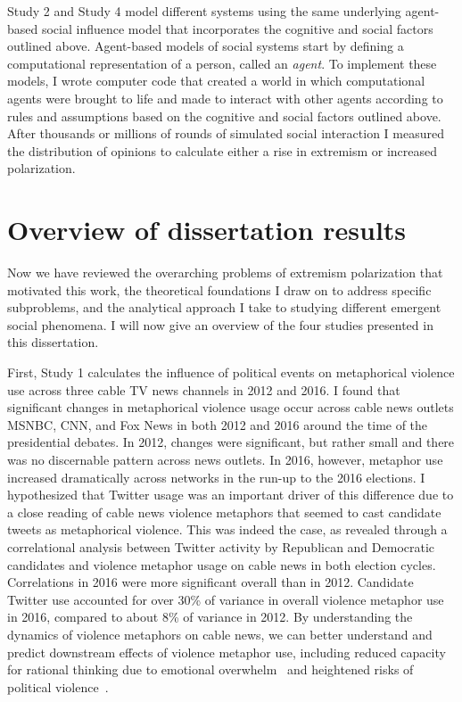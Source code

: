 \documentclass[12pt,letterpaper]{article}
\begin{document}
Study 2 and Study 4 model different systems using the same underlying
agent-based social influence model that incorporates the cognitive and social 
factors outlined above. Agent-based models of social systems start 
by defining a computational representation of a person, called
an \emph{agent}. To implement these models, 
I wrote computer code that created a world in which computational agents
were brought to life and made to interact with other agents according to rules and
assumptions based on the cognitive and social factors outlined above. 
After thousands or millions of rounds of simulated social interaction I
measured the distribution of opinions to calculate either a rise in extremism or
increased polarization.
     

\section{Overview of dissertation results}

Now we have reviewed the overarching problems of extremism polarization that
motivated this work, the
theoretical foundations I draw on to address specific subproblems, and
the analytical approach I take to studying different emergent social
phenomena. I will now give an overview of the four studies presented in this
dissertation.

First, Study 1  
calculates the influence of political events on metaphorical violence use across
three cable TV news channels in 2012 and 2016. I found that significant changes
in metaphorical violence usage occur across cable news outlets MSNBC, CNN, and
Fox News in both 2012 and 2016 around the time of the presidential debates. 
In 2012, changes were significant, but rather small and there was no discernable
pattern across news outlets. In 2016, however, metaphor use increased dramatically
across networks in the run-up to the 2016 elections.  
I hypothesized that Twitter usage was an important driver of this difference due to 
a close reading of cable news violence metaphors that seemed to cast candidate
tweets as metaphorical violence. This was indeed the case, as revealed through a
correlational analysis between Twitter activity by Republican
and Democratic candidates and violence metaphor usage on cable news in both
election cycles. Correlations
in 2016 were more significant overall than in 2012. Candidate Twitter use
accounted for over 30\% of variance in overall violence metaphor use in 2016, compared to
about 8\% of variance in 2012. By understanding the
dynamics of violence metaphors on cable news, we can better understand and 
predict downstream effects of violence metaphor use, including reduced capacity
for rational thinking due to emotional overwhelm~\cite{Suhay2018} and heightened
risks of political violence~\cite{Kalmoe2014,Kalmoe2018}.
\end{document}
